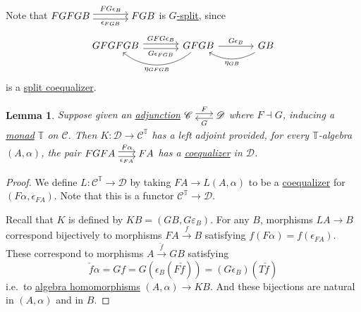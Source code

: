 \documentclass{article}
\newenvironment{tikzcdi}{\begin{tikzcd}[cramped, sep=scriptsize]}{\end{tikzcd}}
\let\to\longrightarrow
\newtheorem{nlemma}[nthm]{Lemma}
\begin{document}
Note that $\begin{tikzcd}[cramped, column sep=large]FGFGB \rar[shift left]{FG\epsilon_B} \rar[shift right,']{\epsilon_{FGB}} & FGB\end{tikzcd}$ is \hyperlink{def:gsplit}{$G$-split}, since
\begin{equation*}
  \begin{tikzcd}[column sep=large]
  GFGFGB \rar[shift left]{GFG\epsilon_B} \rar[shift right,']{G\epsilon_{FGB}} & GFGB \lar[bend left=40]{\eta_{GFGB}} \rar{G\epsilon_B} & GB \lar[bend left]{\eta_{GB}}
  \end{tikzcd}
\end{equation*}
is a \hyperlink{def:splitcoeq}{split coequalizer}.
\begin{nlemma}\label{lem:5.11}
  Suppose given an \hyperlink{def:adj}{adjunction}
  $ \begin{tikzcdi} \mathscr{C} \rar[shift left]{F} & \mathscr{D} \lar[shift left]{G} \end{tikzcdi} $
  where \(F \dashv G\), inducing a \hyperlink{def:monad}{monad} $\mathbb{T}$ on \(\mathscr{C}\).
  Then \hyperlink{def:emcomp}{$K: \mathscr{D} \to \mathscr{C}^\mathbb{T}$} has a left adjoint provided, for every $\mathbb{T}$-algebra \((A, \alpha)\), the pair
  $\begin{tikzcdi}
    FGFA \ar[r, shift left, "F\alpha"] \ar[r, shift right, "\epsilon_{FA}"'] & FA
  \end{tikzcdi}$
  has a \hyperlink{def:equalizer}{coequalizer} in $\mathscr{D}$.
\end{nlemma}
\begin{proof}
  We define $L: \mathscr{C}^\mathbb{T} \to \mathscr{D}$ by taking $FA \to L(A, \alpha)$ to be a \hyperlink{def:equalizer}{coequalizer} for $(F\alpha, \epsilon_{FA})$.
  Note that this is a functor $\mathscr{C}^\mathbb{T} \to \mathscr{D}$.

  Recall that \hyperlink{def:emcomp}{$K$} is defined by $KB = (GB, G\varepsilon_B)$.
  For any $B$, morphisms $LA \to B$ correspond bijectively to morphisms $FA \overset{f}\to B$ satisfying $f(F\alpha) = f(\epsilon_{FA})$.
  These correspond to morphisms $A \overset{\check f}\to GB$ satisfying
  \begin{equation*}
    \check f \alpha = Gf = G(\epsilon_B(F \check f)) = (G\epsilon_B)(T \check f)
  \end{equation*}
  i.e.\ to \hyperlink{def:em}{algebra homomorphisms} $(A, \alpha) \to KB$. And these bijections are natural in $(A, \alpha)$ and in $B$.
\end{proof}
\end{document}
